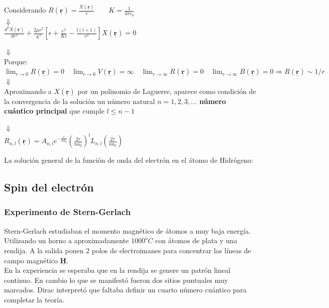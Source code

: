 \documentclass[oneside]{book}
\numberwithin{equation}{section}
\numberwithin{figure}{section}
\numberwithin{table}{section}
\newcommand{\vect}[1]{\underline{\textbf{#1}}}
\begin{document}
\begin{center}
						Considerando $R(\vect{r})=\frac{X(\vect{r})}{r} \qquad K=\frac{1}{4\pi \epsilon_0}$\\
						
						$\Downarrow$\\
						
						$\frac{d^2 X(\vect{r})}{d r^2}+\frac{2\mu r^2}{\hbar^2}\left[ \epsilon+\frac{e^2}{Kr}-\frac{l(l+1)}{r^2}\right] X(\vect{r})=0$
						
						$\Downarrow$\\
						
						Porque: $\lim_{r \to 0}R(\vect{r})=0 \quad \lim_{r \to 0}V(\vect{r})=\infty \quad \lim_{r \to \infty}R(\vect{r})=0 \quad \lim_{r \to \infty}B(\vect{r})=0 \Rightarrow R(\vect{r}) \sim 1/r$\\
						
						$\Downarrow$\\
						
						Aproximando a $X(\vect{r})$ por un polinomio de Laguerre, aparece como condición de la convergencia de la solución un número natural \textbf{$n=1,2,3,\ldots$ número cuántico principal} que cumple $l \leq n-1$
						
						$\Downarrow$\\
						
						$R_{n,l}(\vect{r})=A_{n,l} e^{-\frac{r}{n a_0}}\left(\frac{2r}{n a_0}\right)^l L_{n,l} \left(\frac{2r}{n a_0}\right)$
					\end{center}
					
					La solución general de la función de onda del electrón en el átomo de Hidrógeno:\boxed{\Psi_{n,l,m}(\vect{r},\phi,\theta)=R_{n,l}(\vect{r}) Y_{l,m}(\theta,\phi)}

			\subsection{Spin del electrón}				
				\subsubsection{Experimento de Stern-Gerlach}
					
					Stern-Gerlach estudiaban el momento magnético de átomos a muy baja energía. Utilizando un horno a aproximadamente $1000^o C$ con átomos de plata y una rendija. A la salida ponen 2 polos de electroimanes para concentrar las líneas de campo magnético $\vect{H}$.\\
					
					En la experiencia se esperaba que en la rendija se genere un patrón lineal continuo. En cambio lo que se manifestó fueron dos sitios puntuales muy marcados. Dirac interpretó que faltaba definir un cuarto número cuántico para completar la teoría.\\
					
\end{document}
